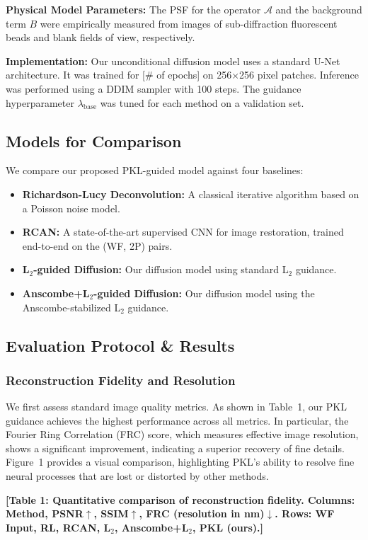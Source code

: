 \documentclass{article}
\newcommand{\wf}{WF\xspace}
\newcommand{\twop}{2P\xspace}
\begin{document}
\textbf{Physical Model Parameters:} The PSF for the operator $\mathcal{A}$ and the background term $B$ were empirically measured from images of sub-diffraction fluorescent beads and blank fields of view, respectively.

\textbf{Implementation:} Our unconditional diffusion model uses a standard U-Net architecture. It was trained for [{\# of epochs}] on 256$\times$256 pixel patches. Inference was performed using a DDIM sampler with 100 steps. The guidance hyperparameter $\lambda_{\text{base}}$ was tuned for each method on a validation set.

\subsection{Models for Comparison}
We compare our proposed PKL-guided model against four baselines:
\begin{itemize}
\item \textbf{Richardson-Lucy Deconvolution:} A classical iterative algorithm based on a Poisson noise model.
\item \textbf{RCAN:} A state-of-the-art supervised CNN for image restoration, trained end-to-end on the (\wf, \twop) pairs.
\item \textbf{L$_2$-guided Diffusion:} Our diffusion model using standard L$_2$ guidance.
\item \textbf{Anscombe+L$_2$-guided Diffusion:} Our diffusion model using the Anscombe-stabilized L$_2$ guidance.
\end{itemize}

\subsection{Evaluation Protocol \& Results}

\subsubsection{Reconstruction Fidelity and Resolution}
We first assess standard image quality metrics. As shown in Table~1, our PKL guidance achieves the highest performance across all metrics. In particular, the Fourier Ring Correlation (FRC) score, which measures effective image resolution, shows a significant improvement, indicating a superior recovery of fine details. Figure~1 provides a visual comparison, highlighting PKL's ability to resolve fine neural processes that are lost or distorted by other methods.

\textbf{[Table 1: Quantitative comparison of reconstruction fidelity. Columns: Method, PSNR$\uparrow$, SSIM$\uparrow$, FRC (resolution in nm)$\downarrow$. Rows: WF Input, RL, RCAN, L$_2$, Anscombe+L$_2$, PKL (ours).]}
\end{document}

